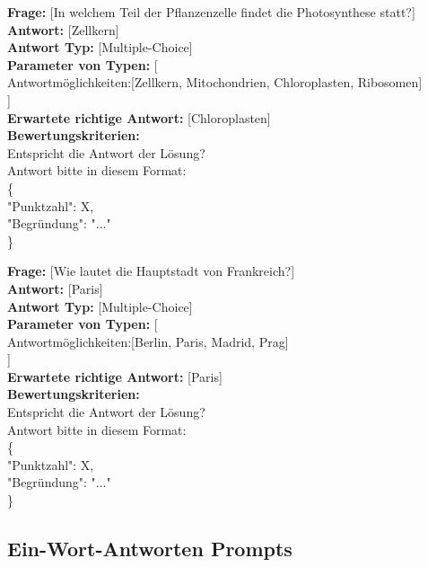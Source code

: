 \documentclass[a4paper,12pt]{article}
\begin{document}
\textbf{Frage:} [In welchem Teil der Pflanzenzelle findet die Photosynthese statt?] \\
\textbf{Antwort:} [Zellkern] \\
\textbf{Antwort Typ:} [Multiple-Choice] \\
\textbf{Parameter von Typen:} [\\
Antwortmöglichkeiten:[Zellkern, Mitochondrien, Chloroplasten, Ribosomen] \\
] \\
\textbf{Erwartete richtige Antwort:} [Chloroplasten] \\
\textbf{Bewertungskriterien:} \\
Entspricht die Antwort der Lösung? \\
Antwort bitte in diesem Format: \\
\{ \\
"Punktzahl": X, \\
"Begründung": "..." \\
\}

\vspace{1em}

\textbf{Frage:} [Wie lautet die Hauptstadt von Frankreich?] \\
\textbf{Antwort:} [Paris] \\
\textbf{Antwort Typ:} [Multiple-Choice] \\
\textbf{Parameter von Typen:} [\\
Antwortmöglichkeiten:[Berlin, Paris, Madrid, Prag] \\
] \\
\textbf{Erwartete richtige Antwort:} [Paris] \\
\textbf{Bewertungskriterien:} \\
Entspricht die Antwort der Lösung? \\
Antwort bitte in diesem Format: \\
\{ \\
"Punktzahl": X, \\
"Begründung": "..." \\
\}

\subsection{Ein-Wort-Antworten Prompts}
\end{document}
